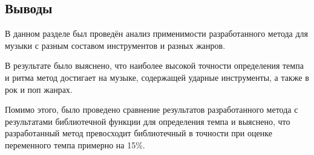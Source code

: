 \subsection*{Выводы}
В данном разделе был проведён анализ применимости разработанного метода для музыки с разным составом инструментов и разных жанров. 

В результате было выяснено, что наиболее высокой точности определения темпа и ритма метод достигает на музыке, содержащей ударные инструменты, а также в рок и поп жанрах.

Помимо этого, было проведено сравнение результатов разработанного метода с результатами библиотечной функции для определения темпа и выяснено, что разработанный метод превосходит библиотечный в точности при оценке переменного темпа примерно на 15\%.